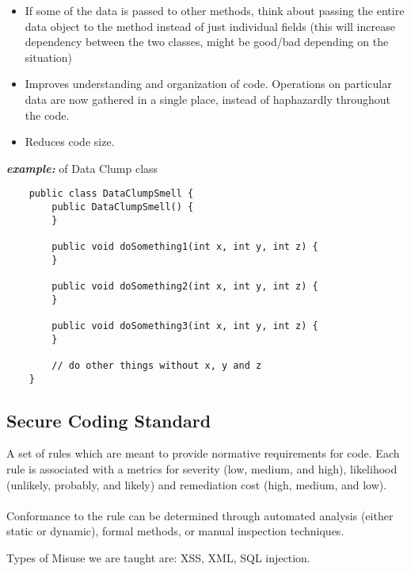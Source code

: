 \documentclass[a4paper]{article}
\begin{document}
\begin{itemize}
\begin{itemize}[label=$\circ$]
		\begin{itemize}[label=\tiny$\blacksquare$]
			\item If some of the data is passed to other methods, think about passing the entire data object to the method instead of just individual fields (this will increase dependency between the two classes, might be good/bad depending on the situation)
			\item Improves understanding and organization of code. Operations on particular data are now gathered in a single place, instead of haphazardly throughout the code.
			\item Reduces code size.
		\end{itemize}
	\end{itemize}
\end{itemize}
\textbf{\textit{example:}} of Data Clump class
\begin{verbatim}
	public class DataClumpSmell {
		public DataClumpSmell() {
		}
		
		public void doSomething1(int x, int y, int z) {
		}
		
		public void doSomething2(int x, int y, int z) {
		}
		
		public void doSomething3(int x, int y, int z) {
		}
		
		// do other things without x, y and z
	}
\end{verbatim}
\subsection{Secure Coding Standard}
A set of rules which are meant to provide normative requirements for code. Each rule is associated with a metrics for severity (low, medium, and high), likelihood (unlikely, probably, and likely) and remediation cost (high, medium, and low).\\
\\
Conformance to the rule can be determined through automated analysis (either static or dynamic), formal methods, or manual inspection techniques.
\begin{displayquote}
	Types of Misuse we are taught are: XSS, XML, SQL injection.
\end{displayquote}
\end{document}
